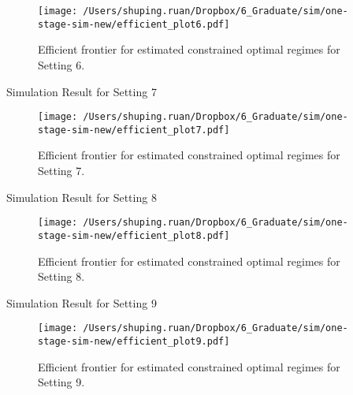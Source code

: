 \documentclass[12pt]{article}
\begin{document}
\begin{figure}[!htb]
	\centering
	\texttt{[image: /Users/shuping.ruan/Dropbox/6\_Graduate/sim/one-stage-sim-new/efficient\_plot6.pdf]}
	\caption{Efficient frontier for estimated constrained optimal regimes for Setting 6.}
	\label{fig:6}
\end{figure}
\begin{table}[!htbp]
	\centering
	{\tt
		
	}
	\caption {Simulation Result for Setting 7}
\end{table} 
\begin{figure}[!htb]
	\centering
	\texttt{[image: /Users/shuping.ruan/Dropbox/6\_Graduate/sim/one-stage-sim-new/efficient\_plot7.pdf]}
	\caption{Efficient frontier for estimated constrained optimal regimes for Setting 7.}
	\label{fig:7}
\end{figure}
\begin{table}[!htbp]
	\centering
	{\tt
		
	}
	\caption {Simulation Result for Setting 8}
\end{table} 
\begin{figure}[!htb]
	\centering
	\texttt{[image: /Users/shuping.ruan/Dropbox/6\_Graduate/sim/one-stage-sim-new/efficient\_plot8.pdf]}
	\caption{Efficient frontier for estimated constrained optimal regimes for Setting 8.}
	\label{fig:8}
\end{figure}
\begin{table}[!htbp]
	\centering
	{\tt
		
	}
	\caption {Simulation Result for Setting 9}
\end{table} 
\begin{figure}[!htb]
	\centering
	\texttt{[image: /Users/shuping.ruan/Dropbox/6\_Graduate/sim/one-stage-sim-new/efficient\_plot9.pdf]}
	\caption{Efficient frontier for estimated constrained optimal regimes for Setting 9.}
	\label{fig:9}
\end{figure}
\end{document}
